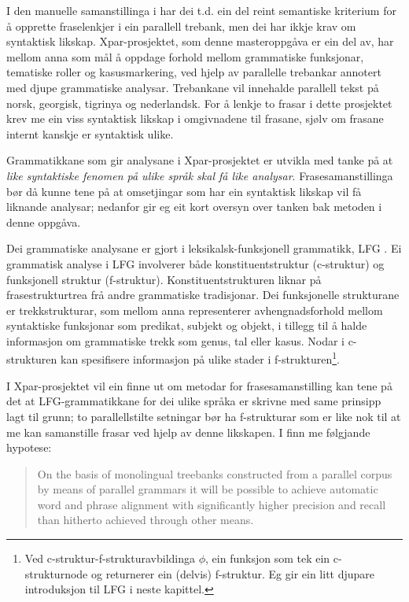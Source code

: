 \documentclass[12pt,a4paper,oneside,draft]{report}
\begin{document}
I den manuelle samanstillinga i \citet{samuelsson2006pap} har dei
 t.d. ein del reint semantiske kriterium for å opprette fraselenkjer i
 ein parallell trebank, men dei har ikkje krav om syntaktisk likskap.
 Xpar-prosjektet, som denne masteroppgåva er ein del av, har mellom
 anna som mål å oppdage forhold mellom grammatiske funksjonar,
 tematiske roller og kasusmarkering, ved hjelp av parallelle trebankar
 annotert med djupe grammatiske analysar. Trebankane vil innehalde
 parallell tekst på norsk, georgisk, tigrinya og nederlandsk.  For å
 lenkje to frasar i dette prosjektet krev me ein viss syntaktisk
 likskap i omgivnadene til frasane, sjølv om frasane internt kanskje
 er syntaktisk ulike.

Grammatikkane som gir analysane i Xpar-prosjektet er utvikla med tanke
 på at \emph{like syntaktiske fenomen på ulike språk skal få like  analysar}. Frasesamanstillinga bør då kunne tene på at omsetjingar
 som har ein syntaktisk likskap vil få liknande analysar; nedanfor gir
 eg eit kort oversyn over tanken bak metoden i denne oppgåva.

Dei grammatiske analysane er gjort i leksikalsk-funksjonell
 grammatikk, LFG \citep{bresnan2001lfs}. Ei grammatisk analyse i LFG
 involverer både konstituentstruktur (c\hyp{}struktur) og funksjonell
 struktur (f\hyp{}struktur). Konstituentstrukturen liknar på
 frasestrukturtrea frå andre grammatiske tradisjonar. Dei funksjonelle
 strukturane er trekkstrukturar, som mellom anna representerer
 avhengnadsforhold mellom syntaktiske funksjonar som predikat, subjekt
 og objekt, i tillegg til å halde informasjon om grammatiske trekk som
 genus, tal eller kasus. Nodar i c\hyp{}strukturen kan spesifisere
 informasjon på ulike stader i f\hyp{}strukturen\footnote{Ved c\hyp{}struktur-f\hyp{}strukturavbildinga $\phi$, ein funksjon som
        tek ein c\hyp{}strukturnode og returnerer ein (delvis)
        f\hyp{}struktur. Eg gir ein litt djupare introduksjon til LFG
        i neste kapittel. }.

I Xpar-prosjektet vil ein finne ut om metodar for frasesamanstilling
 kan tene på det at LFG-grammatikkane for dei ulike språka er skrivne
 med same prinsipp lagt til grunn; to parallellstilte setningar bør ha
 f\hyp{}strukturar som er like nok til at me kan samanstille frasar
 ved hjelp av denne likskapen. I \citet[s.~72]{dyvik2009lmp} finn me
 følgjande hypotese:

\begin{quote}
 On the basis of monolingual treebanks constructed from a parallel
 corpus by means of parallel grammars it will be possible to achieve
 automatic word and phrase alignment with significantly higher
 precision and recall than hitherto achieved through other means.
\end{quote}
\end{document}
